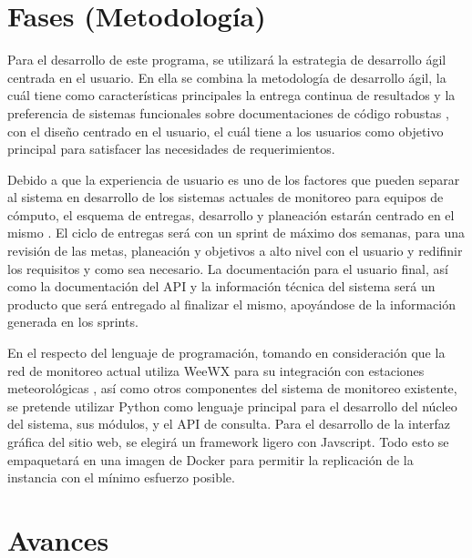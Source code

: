 \section{Fases (Metodología)}

Para el desarrollo de este programa, se utilizará la estrategia de desarrollo ágil centrada en el usuario. En ella se combina la metodología de desarrollo ágil, la cuál tiene como características principales la entrega continua de resultados y la preferencia de sistemas funcionales sobre documentaciones de código robustas \cite{agile_manifesto}, con el diseño centrado en el usuario, el cuál tiene a los usuarios como objetivo principal para satisfacer las necesidades de requerimientos.

Debido a que la experiencia de usuario es uno de los factores que pueden separar al sistema en desarrollo de los sistemas actuales de monitoreo para equipos de cómputo, el esquema de entregas, desarrollo y planeación estarán centrado en el mismo \cite{hussain_agile_usercentered}. El ciclo de entregas será con un sprint de máximo dos semanas, para una revisión de las metas, planeación y objetivos a alto nivel con el usuario y redifinir los requisitos y como sea necesario. La documentación para el usuario final, así como la documentación del API y la información técnica del sistema será un producto que será entregado al finalizar el mismo, apoyándose de la información generada en los sprints.

En el respecto del lenguaje de programación, tomando en consideración que la red de monitoreo actual utiliza WeeWX para su integración con estaciones meteorológicas \cite{red_climatologica_uacj}, así como otros componentes del sistema de monitoreo existente, se pretende utilizar Python como lenguaje principal para el desarrollo del núcleo del sistema, sus módulos, y el API de consulta. Para el desarrollo de la interfaz gráfica del sitio web, se elegirá un framework ligero con Javscript. Todo esto se empaquetará en una imagen de Docker para permitir la replicación de la instancia con el mínimo esfuerzo posible.


\section{Avances}


